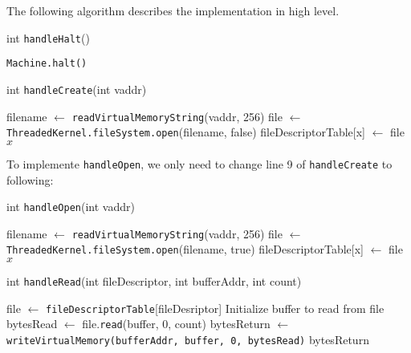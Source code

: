 \documentclass{article}
\begin{document}
\begin{spacing}{1.1}
The following algorithm describes the implementation in high level.

\begin{algorithm}
  \caption{int \texttt{handleHalt}()}
\begin{algorithmic}[1]
  \ENDIF
  \STATE \texttt{Machine.halt()}
\end{algorithmic}
\end{algorithm}

\begin{algorithm}
  \caption{int \texttt{handleCreate}(int vaddr)}
\begin{algorithmic}[1]
  \ENDIF
  \STATE filename $\leftarrow$ \texttt{readVirtualMemoryString}(vaddr, 256)
  \ENDIF
    \STATE file $\leftarrow$ \texttt{ThreadedKernel.fileSystem.open}(filename, false)
    \STATE fileDescriptorTable[x] $\leftarrow$ file
    \RETURN $x$
  \ELSE
  \ENDIF
\end{algorithmic}
\end{algorithm}

To implemente \texttt{handleOpen}, we only need to change line 9 of \texttt{handleCreate} to following:
\begin{algorithm}
  \caption{int \texttt{handleOpen}(int vaddr)}
\begin{algorithmic}[1]
  \ENDIF
  \STATE filename $\leftarrow$ \texttt{readVirtualMemoryString}(vaddr, 256)
  \ENDIF
    \STATE \colorbox{myyellow}{file $\leftarrow$ \texttt{ThreadedKernel.fileSystem.open}(filename, true)}
    \STATE fileDescriptorTable[x] $\leftarrow$ file
    \RETURN $x$
  \ELSE
  \ENDIF
\end{algorithmic}
\end{algorithm}

\begin{algorithm}
  \caption{int \texttt{handleRead}(int fileDescriptor, int bufferAddr, int count)}
\begin{algorithmic}[1]
  \ENDIF
  \STATE file $\leftarrow$ \texttt{fileDescriptorTable}[fileDesriptor]
  \ENDIF
  \STATE Initialize buffer to read from file
  \STATE bytesRead $\leftarrow$ file.\texttt{read}(buffer, 0, count)
  \ELSE
    \STATE bytesReturn $\leftarrow$ \texttt{writeVirtualMemory(bufferAddr, buffer, 0, bytesRead)}
    \RETURN bytesReturn
  \ENDIF
\end{algorithmic}
\end{algorithm}


\end{spacing}
\end{document}
